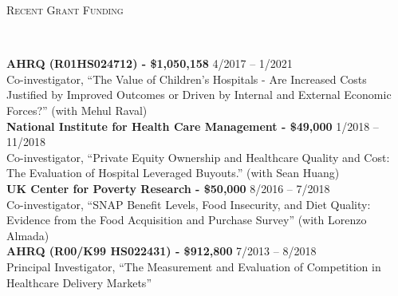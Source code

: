 \documentclass[9pt]{article}
\newenvironment{changemargin}[2]{%
  \begin{list}{}{%
    \setlength{\topsep}{0pt}%
    \setlength{\leftmargin}{#1}%
    \setlength{\rightmargin}{#2}%
    \setlength{\listparindent}{\parindent}%
    \setlength{\itemindent}{\parindent}%
    \setlength{\parsep}{\parskip}%
  }%
  \item[]}{\end{list}
}
\newcommand{\lineover}{
	\begin{changemargin}{-0.05in}{-0.05in}
		\vspace*{-8pt}
		\hrulefill \\
		\vspace*{-2pt}
	\end{changemargin}
}
\newcommand{\header}[1]{
	\begin{changemargin}{-0.5in}{-0.5in}
	\scshape{#1}\\
  	\lineover
	\end{changemargin}
}
\newenvironment{body} {
	\vspace*{-16pt}
	\begin{changemargin}{-0.25in}{-0.5in}
  }	
	{\end{changemargin}
}
\begin{document}
\header{Recent Grant Funding}
\begin{body}
\vspace{13pt}
 \textbf{AHRQ (R01HS024712) - \$1,050,158} \hfill 4/2017 -- 1/2021 \\
 Co-investigator, ``The Value of Children's Hospitals - Are Increased Costs Justified by Improved Outcomes or Driven by Internal and External Economic Forces?'' (with Mehul Raval) \\

 \textbf{National Institute for Health Care Management - \$49,000} \hfill 1/2018 -- 11/2018 \\
 Co-investigator, ``Private Equity Ownership and Healthcare Quality and Cost: The Evaluation of Hospital Leveraged Buyouts.'' (with Sean Huang) \\

 \textbf{UK Center for Poverty Research - \$50,000 } \hfill 8/2016 -- 7/2018 \\
 Co-investigator, ``SNAP Benefit Levels, Food Insecurity, and Diet Quality: Evidence from the Food Acquisition and Purchase Survey'' (with Lorenzo Almada) \\

 \textbf{AHRQ (R00/K99 HS022431) - \$912,800} \hfill 7/2013 -- 8/2018 \\
 Principal Investigator, ``The Measurement and Evaluation of Competition in Healthcare Delivery Markets'' \\

\end{body}
\smallskip


\end{document}
